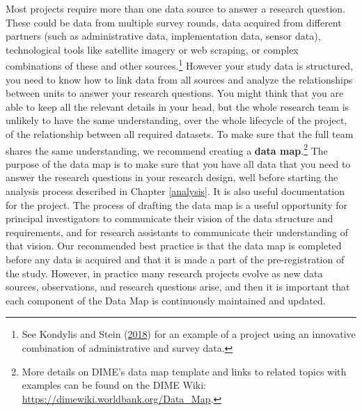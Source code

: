\documentclass[
]{book}
\begin{document}
Most projects require more than one data source to answer a research question.
These could be data from multiple survey rounds,
data acquired from different partners
(such as administrative data, implementation data, sensor data),
technological tools like satellite imagery or web scraping,
or complex combinations of these and other sources.\footnote{See Kondylis and Stein (\protect\hyperlink{ref-kondylis2018speed}{2018}) for an example of a project using an innovative combination of administrative and survey data.}
However your study data is structured,
you need to know how to link data from all sources
and analyze the relationships between units
to answer your research questions.
You might think that you are able to keep all the relevant details in your head,
but the whole research team is unlikely to have the same understanding,
over the whole lifecycle of the project, of the relationship between all required datasets.
To make sure that the full team shares the same understanding,
we recommend creating a \textbf{data map}.\footnote{More details on DIME's data map template
  and links to related topics with examples
  can be found on the DIME Wiki:
  \url{https://dimewiki.worldbank.org/Data_Map}.}
The purpose of the data map is to make sure that
you have all data that you need
to answer the research questions in your research design,
well before starting the analysis process described in Chapter \ref{analysis}.
It is also useful documentation for the project.
The process of drafting the data map is a useful
opportunity for principal investigators
to communicate their vision of the data structure and requirements,
and for research assistants to communicate
their understanding of that vision.
Our recommended best practice is that
the data map is completed before any data is acquired and
that it is made a part of the pre-registration of the study.
However, in practice many research projects evolve
as new data sources, observations, and research questions arise,
and then it is important that each component of the Data Map is continuously maintained and updated.
\end{document}
